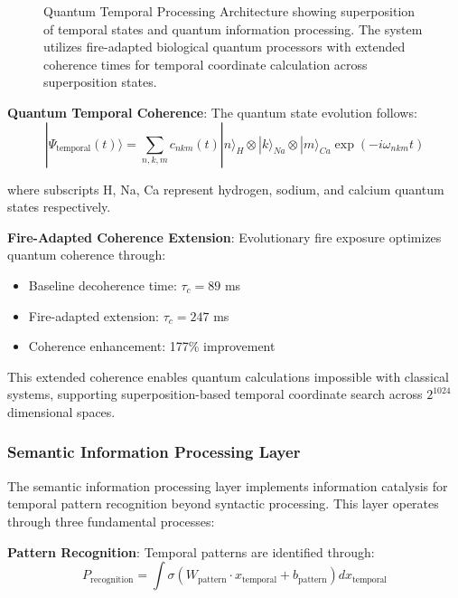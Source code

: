 \documentclass[12pt,a4paper]{article}
\begin{document}
\begin{figure}[H]
\caption{Quantum Temporal Processing Architecture showing superposition of temporal states and quantum information processing. The system utilizes fire-adapted biological quantum processors with extended coherence times for temporal coordinate calculation across superposition states.}
\label{fig:quantum_temporal_processing}
\end{figure}

\textbf{Quantum Temporal Coherence}: The quantum state evolution follows:
$$|\Psi_{\text{temporal}}(t)\rangle = \sum_{n,k,m} c_{nkm}(t) |n\rangle_H \otimes |k\rangle_{Na} \otimes |m\rangle_{Ca} \exp(-i\omega_{nkm} t)$$

where subscripts H, Na, Ca represent hydrogen, sodium, and calcium quantum states respectively.

\textbf{Fire-Adapted Coherence Extension}: Evolutionary fire exposure optimizes quantum coherence through:
\begin{itemize}
\item Baseline decoherence time: $\tau_c = 89$ ms
\item Fire-adapted extension: $\tau_c = 247$ ms
\item Coherence enhancement: 177\% improvement
\end{itemize}

This extended coherence enables quantum calculations impossible with classical systems, supporting superposition-based temporal coordinate search across $2^{1024}$ dimensional spaces.

\subsubsection{Semantic Information Processing Layer}

The semantic information processing layer implements information catalysis for temporal pattern recognition beyond syntactic processing. This layer operates through three fundamental processes:

\textbf{Pattern Recognition}: Temporal patterns are identified through:
$$P_{\text{recognition}} = \int \sigma(W_{\text{pattern}} \cdot x_{\text{temporal}} + b_{\text{pattern}}) dx_{\text{temporal}}$$
\end{document}
